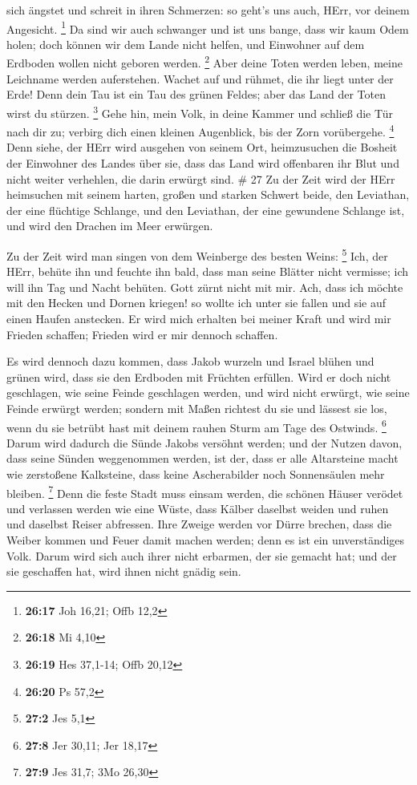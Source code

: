 sich ängstet und schreit in ihren Schmerzen: so geht's uns auch, HErr,
vor deinem Angesicht. \footnote{\textbf{26:17} Joh 16,21; Offb 12,2}
 Da sind wir auch schwanger und ist uns bange, dass wir
kaum Odem holen; doch können wir dem Lande nicht helfen, und Einwohner
auf dem Erdboden wollen nicht geboren werden. \footnote{\textbf{26:18}
  Mi 4,10}  Aber deine Toten werden leben, meine Leichname
werden auferstehen. Wachet auf und rühmet, die ihr liegt unter der Erde!
Denn dein Tau ist ein Tau des grünen Feldes; aber das Land der Toten
wirst du stürzen. \footnote{\textbf{26:19} Hes 37,1-14; Offb 20,12}
 Gehe hin, mein Volk, in deine Kammer und schließ die Tür
nach dir zu; verbirg dich einen kleinen Augenblick, bis der Zorn
vorübergehe. \footnote{\textbf{26:20} Ps 57,2}  Denn siehe,
der HErr wird ausgehen von seinem Ort, heimzusuchen die Bosheit der
Einwohner des Landes über sie, dass das Land wird offenbaren ihr Blut
und nicht weiter verhehlen, die darin erwürgt sind. \# 27 
Zu der Zeit wird der HErr heimsuchen mit seinem harten, großen und
starken Schwert beide, den Leviathan, der eine flüchtige Schlange, und
den Leviathan, der eine gewundene Schlange ist, und wird den Drachen im
Meer erwürgen.

 Zu der Zeit wird man singen von dem Weinberge des besten
Weins: \footnote{\textbf{27:2} Jes 5,1}  Ich, der HErr,
behüte ihn und feuchte ihn bald, dass man seine Blätter nicht vermisse;
ich will ihn Tag und Nacht behüten.  Gott zürnt nicht mit
mir. Ach, dass ich möchte mit den Hecken und Dornen kriegen! so wollte
ich unter sie fallen und sie auf einen Haufen anstecken.  Er
wird mich erhalten bei meiner Kraft und wird mir Frieden schaffen;
Frieden wird er mir dennoch schaffen.

 Es wird dennoch dazu kommen, dass Jakob wurzeln und Israel
blühen und grünen wird, dass sie den Erdboden mit Früchten erfüllen.
 Wird er doch nicht geschlagen, wie seine Feinde geschlagen
werden, und wird nicht erwürgt, wie seine Feinde erwürgt werden;
 sondern mit Maßen richtest du sie und lässest sie los, wenn
du sie betrübt hast mit deinem rauhen Sturm am Tage des Ostwinds.
\footnote{\textbf{27:8} Jer 30,11; Jer 18,17}  Darum wird
dadurch die Sünde Jakobs versöhnt werden; und der Nutzen davon, dass
seine Sünden weggenommen werden, ist der, dass er alle Altarsteine macht
wie zerstoßene Kalksteine, dass keine Ascherabilder noch Sonnensäulen
mehr bleiben. \footnote{\textbf{27:9} Jes 31,7; 3Mo 26,30} 
Denn die feste Stadt muss einsam werden, die schönen Häuser verödet und
verlassen werden wie eine Wüste, dass Kälber daselbst weiden und ruhen
und daselbst Reiser abfressen.  Ihre Zweige werden vor
Dürre brechen, dass die Weiber kommen und Feuer damit machen werden;
denn es ist ein unverständiges Volk. Darum wird sich auch ihrer nicht
erbarmen, der sie gemacht hat; und der sie geschaffen hat, wird ihnen
nicht gnädig sein.

